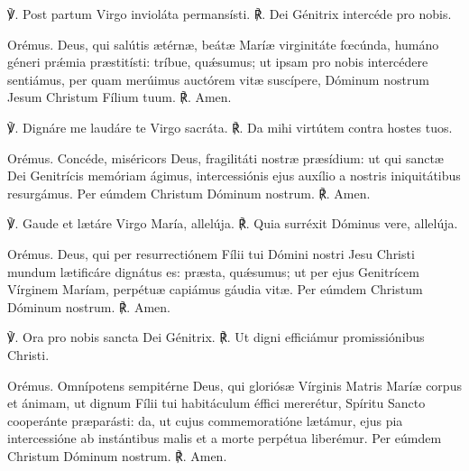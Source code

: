
℣. Post partum Virgo invioláta permansísti.
℟. Dei Génitrix intercéde pro nobis.

Orémus.
Deus, qui salútis ætérnæ, 
beátæ Maríæ virginitáte fœcúnda,
humáno géneri prǽmia præstitísti:
tríbue, quǽsumus; ut ipsam pro nobis intercédere sentiámus,
per quam merúimus auctórem vitæ suscípere,
Dóminum nostrum Jesum Christum Fílium tuum.
℟. Amen.

\noindent \hrulefill



℣. Dignáre me laudáre te Virgo sacráta.
℟. Da mihi virtútem contra hostes tuos.

Orémus.
Concéde, miséricors Deus, fragilitáti nostræ præsídium:
ut qui sanctæ Dei Genitrícis memóriam ágimus,
intercessiónis ejus auxílio a nostris iniquitátibus resurgámus.
Per eúmdem Christum Dóminum nostrum.
℟. Amen. 

\pagebreak

\vspace{0.5cm}


\vspace{2mm}
℣. Gaude et lætáre Virgo María, allelúja.
℟. Quia surréxit Dóminus vere, allelúja.

\vspace{0.5cm}
Orémus.
Deus, qui per resurrectiónem Fílii tui Dómini nostri Jesu Christi
mundum lætificáre dignátus es:
præsta, quǽsumus; ut per ejus Genitrícem Vírginem Maríam,
perpétuæ capiámus gáudia vitæ.
Per eúmdem Christum Dóminum nostrum.
℟. Amen. 

\noindent \hrulefill

\vspace{0.5cm}


\vspace{2mm}
℣. Ora pro nobis sancta Dei Génitrix.
℟. Ut digni efficiámur promissiónibus Christi.

\vspace{0.5cm}
Orémus.
Omnípotens sempitérne Deus,
qui gloriósæ Vírginis Matris Maríæ corpus et ánimam,
ut dignum Fílii tui habitáculum éffici mererétur,
Spíritu Sancto cooperánte præparásti:
da, ut cujus commemoratióne lætámur,
ejus pia intercessióne ab instántibus malis et a morte perpétua liberémur.
Per eúmdem Christum Dóminum nostrum. 
℟. Amen.

